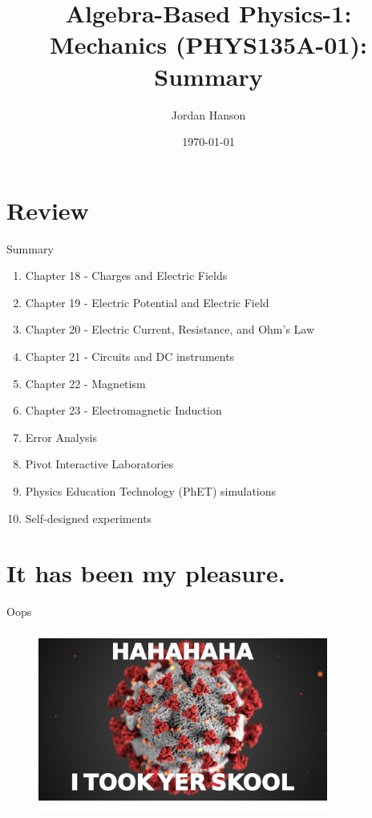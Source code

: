 \documentclass{beamer}
\title{Algebra-Based Physics-1: Mechanics (PHYS135A-01): Summary}
\date{\today}
\author{Jordan Hanson}
\institute{Whittier College Department of Physics and Astronomy}
\begin{document}
\maketitle

\section{Review}

\begin{frame}{Summary}
\begin{enumerate}
\item Chapter 18 - Charges and Electric Fields
\item Chapter 19 - Electric Potential and Electric Field
\item Chapter 20 - Electric Current, Resistance, and Ohm's Law
\item Chapter 21 - Circuits and DC instruments
\item Chapter 22 - Magnetism
\item Chapter 23 - Electromagnetic Induction
\item Error Analysis
\item Pivot Interactive Laboratories
\item Physics Education Technology (PhET) simulations
\item Self-designed experiments
\end{enumerate}
\end{frame}

\section{It has been my pleasure.}

\begin{frame}{Oops}
\begin{figure}
\includegraphics[width=0.85\textwidth]{savage.pdf}
\end{figure}
\end{frame}
\end{document}
